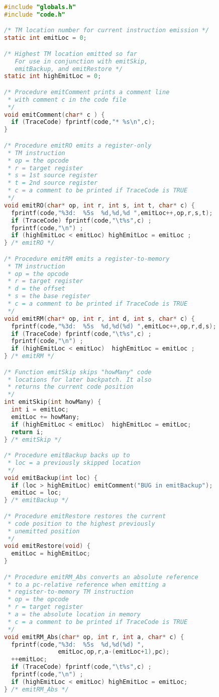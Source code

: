 \documentclass[lang=cn,10pt]{elegantbook}
\begin{document}
\begin{lstlisting}[caption={code.c},language=c]
#include "globals.h"
#include "code.h"

/* TM location number for current instruction emission */
static int emitLoc = 0;

/* Highest TM location emitted so far
   For use in conjunction with emitSkip,
   emitBackup, and emitRestore */
static int highEmitLoc = 0;

/* Procedure emitComment prints a comment line 
 * with comment c in the code file
 */
void emitComment(char* c ) {
  if (TraceCode) fprintf(code,"* %s\n",c);
}

/* Procedure emitRO emits a register-only
 * TM instruction
 * op = the opcode
 * r = target register
 * s = 1st source register
 * t = 2nd source register
 * c = a comment to be printed if TraceCode is TRUE
 */
void emitRO(char* op, int r, int s, int t, char* c) {
  fprintf(code,"%3d:  %5s  %d,%d,%d ",emitLoc++,op,r,s,t);
  if (TraceCode) fprintf(code,"\t%s",c) ;
  fprintf(code,"\n") ;
  if (highEmitLoc < emitLoc) highEmitLoc = emitLoc ;
} /* emitRO */

/* Procedure emitRM emits a register-to-memory
 * TM instruction
 * op = the opcode
 * r = target register
 * d = the offset
 * s = the base register
 * c = a comment to be printed if TraceCode is TRUE
 */
void emitRM(char* op, int r, int d, int s, char* c) {
  fprintf(code,"%3d:  %5s  %d,%d(%d) ",emitLoc++,op,r,d,s);
  if (TraceCode) fprintf(code,"\t%s",c) ;
  fprintf(code,"\n") ;
  if (highEmitLoc < emitLoc)  highEmitLoc = emitLoc ;
} /* emitRM */

/* Function emitSkip skips "howMany" code
 * locations for later backpatch. It also
 * returns the current code position
 */
int emitSkip(int howMany) { 
  int i = emitLoc;
  emitLoc += howMany;
  if (highEmitLoc < emitLoc)  highEmitLoc = emitLoc;
  return i;
} /* emitSkip */

/* Procedure emitBackup backs up to 
 * loc = a previously skipped location
 */
void emitBackup(int loc) {
  if (loc > highEmitLoc) emitComment("BUG in emitBackup");
  emitLoc = loc;
} /* emitBackup */

/* Procedure emitRestore restores the current 
 * code position to the highest previously
 * unemitted position
 */
void emitRestore(void) {
  emitLoc = highEmitLoc;
}

/* Procedure emitRM_Abs converts an absolute reference 
 * to a pc-relative reference when emitting a
 * register-to-memory TM instruction
 * op = the opcode
 * r = target register
 * a = the absolute location in memory
 * c = a comment to be printed if TraceCode is TRUE
 */
void emitRM_Abs(char* op, int r, int a, char* c) {
  fprintf(code,"%3d:  %5s  %d,%d(%d) ",
               emitLoc,op,r,a-(emitLoc+1),pc);
  ++emitLoc;
  if (TraceCode) fprintf(code,"\t%s",c) ;
  fprintf(code,"\n") ;
  if (highEmitLoc < emitLoc) highEmitLoc = emitLoc;
} /* emitRM_Abs */
\end{lstlisting}
\end{document}
